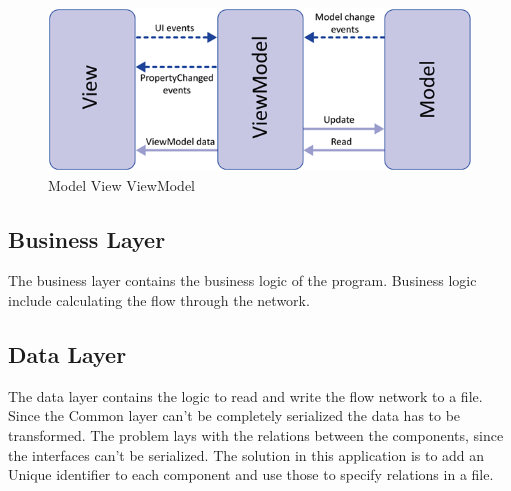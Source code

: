 \begin{figure}[h!]
  \centering
    \includegraphics[scale=0.6]{figures/mvvm.png}
  \caption{Model View ViewModel}
  \label{fig:mvvm}
\end{figure}


\subsection{Business Layer}
The business layer contains the business logic of the program. Business logic include calculating the flow through the network.

\subsection{Data Layer}
The data layer contains the logic to read and write the flow network to a file. Since the Common layer can't be completely serialized the data has to be transformed. The problem lays with the relations between the components, since the interfaces can't be serialized. The solution in this application is to add an Unique identifier to each component and use those to specify relations in a file.